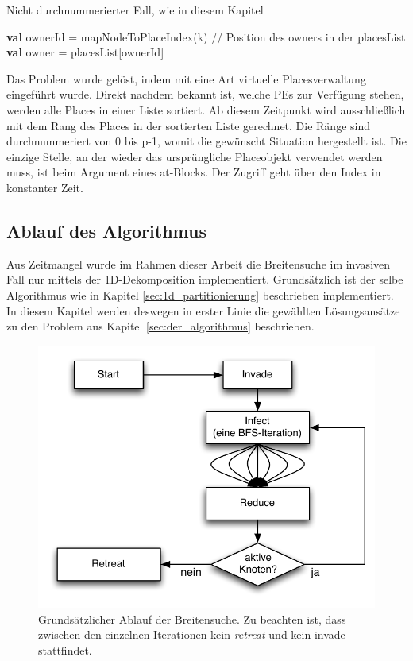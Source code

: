 \begin{algorithm}
	\caption{Nicht durchnummerierter Fall, wie in diesem Kapitel}
	\label{alg:owner_random}
	\begin{algorithmic}[1]
		\State \textbf{val} ownerId = mapNodeToPlaceIndex(k) // Position des owners in der placesList
		\State \textbf{val} owner   = placesList[ownerId]
	\end{algorithmic}
\end{algorithm}

Das Problem wurde gelöst, indem mit eine Art virtuelle Placesverwaltung eingeführt wurde. Direkt nachdem bekannt ist, welche PEs zur Verfügung stehen, werden alle Places in einer Liste sortiert. Ab diesem Zeitpunkt wird ausschließlich mit dem Rang des Places in der sortierten Liste gerechnet. Die Ränge sind durchnummeriert von 0 bis p-1, womit die gewünscht Situation hergestellt ist. Die einzige Stelle, an der wieder das ursprüngliche Placeobjekt verwendet werden muss, ist beim Argument eines at{}-Blocks. Der Zugriff geht  über den Index in konstanter Zeit.

\subsection{Ablauf des Algorithmus} %
\label{sub:ablauf_des_algorithmus}
Aus Zeitmangel wurde im Rahmen dieser Arbeit die Breitensuche im invasiven Fall nur mittels der 1D-Dekomposition implementiert. Grundsätzlich ist der selbe Algorithmus wie in Kapitel \ref{sec:1d_partitionierung} beschrieben implementiert. In diesem Kapitel werden deswegen in erster Linie die gewählten Lösungsansätze zu den Problem aus Kapitel \ref{sec:der_algorithmus} beschrieben.
\begin{figure}[ht]
	\centering
	\label{img:invasive-flow}
	\includegraphics{pics/invasive-flow.pdf}
	\caption{Grundsätzlicher Ablauf der Breitensuche. Zu beachten ist, dass zwischen den einzelnen Iterationen kein \textit{retreat} und kein invade stattfindet.}
\end{figure}

